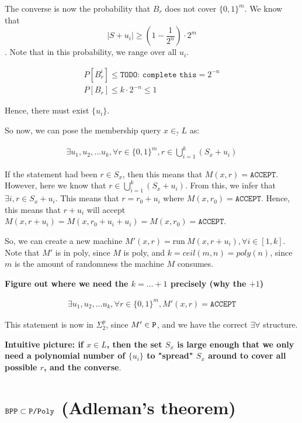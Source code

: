 The converse is now the probability that $B_r$ does not cover $\{0, 1\}^m$.  
We know that $$|S + u_i| \geq (1 - \frac{1}{2^n}) \cdot 2^m$$.
Note that in this probability, we range over all $u_i$.

\begin{align*}
    P[B_r^i] \leq \texttt{TODO: complete this} = 2^{-n} \\
    P[B_r] \leq  k \cdot 2^{-n} \leq 1
\end{align*}

Hence, there must exist $\{ u_i \}$.


So now, we can pose the membership query $x \in_? L$ as:

\begin{align*}
    \exists u_1, u_2, \dots u_k, \forall r \in \{0, 1\}^m, r \in \bigcup_{i = 1}^k (S_x + u_i)
\end{align*}

If the statement had been $r \in S_x$, then this means that $M(x, r) = \texttt{ACCEPT}$.
However, here we know that $r \in \bigcup_{i = 1}^k (S_x + u_i)$. From this, 
we infer that $\exists i, r \in S_x + u_i$.  This means
that $r = r_0 + u_i$ where $M(x, r_0) = \texttt{ACCEPT}$. Hence, this means
that $r + u_i$ will accept $M(x, r + u_i) = M(x, r_0 + u_i + u_i) = M(x, r_0) = \texttt{ACCEPT}$.

So, we can create a new machine $M'(x, r) = \text{run}~M(x, r + u_i),  \forall i \in [1, k]$.
Note that $M'$ is in poly, since $M$ is poly, and $k = ceil(m, n) = poly(n)$, since
$m$ is the amount of randomness the machine $M$ consumes.

\textbf{Figure out where we need the $k = \dots + 1$ precisely (why the $+1$)}

\begin{align*}
    \exists u_1, u_2, \dots u_k, \forall r \in \{0, 1\}^m, M'(x, r) = \texttt{ACCEPT}
\end{align*}

This statement is now in $\Sigma_2^p$, since $M' \in \texttt{P}$, and we have the correct
$\exists \forall$ structure.


\textbf{Intuitive picture: if $x \in L$, then the set $S_x$ is large enough that we
only need a polynomial number of $\{u_i\}$ to "spread" $S_x$ around to cover all
possible $r$, and the converse}.

\section{$\texttt{BPP} \subset \texttt{P/Poly}$ (Adleman's theorem)}

